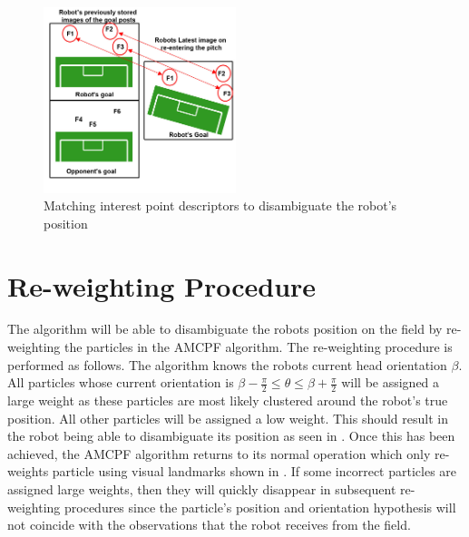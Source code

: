 \documentclass[11pt]{report}
\begin{document}
\begin{figure}[h!] 
  \centering
    \includegraphics[width=0.5\textwidth]{../Drawings/localisation/featureMatching.jpg}
    \caption{Matching interest point descriptors to disambiguate the robot's position}
    \label{fig:featureMatching}
\end{figure}



\section{Re-weighting Procedure}
\label{sec:reweighting}
The algorithm will be able to disambiguate the robots position on the field by re-weighting the particles in the AMCPF algorithm. The re-weighting procedure is performed as follows. The algorithm knows the robots current head orientation $\beta$. All particles whose current orientation is $\beta -\frac{\pi}{2} \leq \theta \leq \beta + \frac{\pi}{2}$ will be assigned a large weight as these particles are most likely clustered around the robot's true position. All other particles will be assigned a low weight. This should result in the robot being able to disambiguate its position as seen in . Once this has been achieved, the AMCPF algorithm returns to its normal operation which only re-weights particle using visual landmarks shown in . If some incorrect particles are assigned large weights, then they will quickly disappear in subsequent re-weighting procedures since the particle's position and orientation hypothesis will not coincide with the observations that the robot receives from the field.\\
\end{document}
